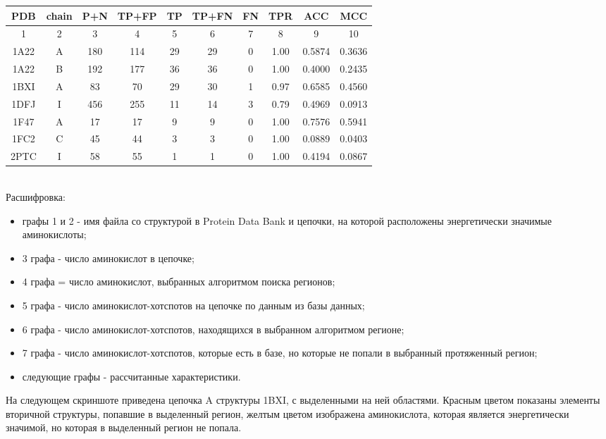 \begin{tabular}{|c|c|c|c|c|c|c|c|c|c|}
\hline
 PDB & chain & P+N & TP+FP & TP & TP+FN & FN & TPR & ACC & MCC\\
 \hline
  1 & 2 & 3 & 4 & 5 & 6 & 7 & 8 & 9 & 10\\
 \hline
1A22 & A & 180 & 114 & 29 & 29 & 0 & 1.00 & 0.5874 & 0.3636\\
1A22 & B & 192 & 177 & 36 & 36 & 0 & 1.00 &
0.4000 & 0.2435
\\
1BXI & A & 83 & 70& 29& 30& 1 & 0.97 &
0.6585 & 0.4560
\\
1DFJ & I & 456 & 255& 11& 14& 3 & 0.79 &
0.4969 & 0.0913
\\
1F47 & A & 17 & 17&	9& 9& 0 & 1.00 &
0.7576 & 0.5941
\\
1FC2 & C & 45 & 44&	3& 3& 0 & 1.00 &
0.0889 & 0.0403
\\
2PTC & I & 58 & 55&	1& 1& 0 & 1.00 &
0.4194 & 0.0867\\
\hline
\end{tabular}
\\[10pt]
Расшифровка: 
\begin{itemize}
\item графы 1 и 2 - имя файла со структурой в Protein Data Bank и цепочки, на которой расположены энергетически значимые аминокислоты;
\item 3 графа - число аминокислот в цепочке;
\item 4 графа = число аминокислот, выбранных алгоритмом поиска регионов;
\item 5 графа - число аминокислот-хотспотов на цепочке по данным из базы данных;
\item 6 графа - число аминокислот-хотспотов, находящихся в выбранном алгоритмом регионе;
\item 7 графа - число аминокислот-хотспотов, которые есть в базе, но которые не попали в выбранный протяженный регион;
\item следующие графы - рассчитанные характеристики.
\end{itemize}

На следующем скриншоте приведена цепочка A структуры 1BXI, с выделенными на ней областями. Красным цветом показаны элементы вторичной структуры, попавшие в выделенный регион, желтым цветом изображена аминокислота, которая является энергетически значимой, но которая в выделенный регион не попала.
 

